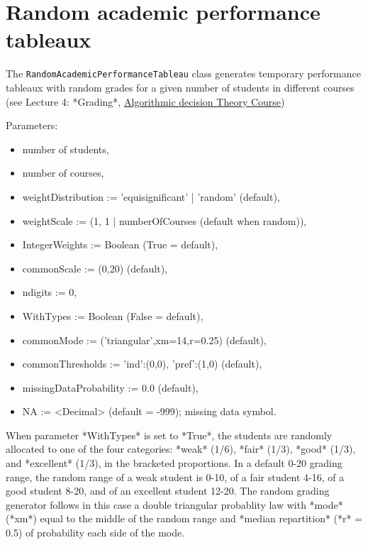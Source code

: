 \section{Random academic performance tableaux}
\label{sec:5.5}

The \texttt{RandomAcademicPerformanceTableau} class generates temporary performance tableaux with random grades for a given number of students in different courses (see Lecture 4: *Grading*, \href {http://hdl.handle.net/10993/37933}{Algorithmic decision Theory Course})
    
Parameters:
\begin{itemize}
\item number of students,
\item number of courses,
\item weightDistribution := 'equisignificant' | 'random' (default),
\item weightScale := (1, 1 | numberOfCourses (default when random)),
\item IntegerWeights := Boolean (True = default),
\item commonScale := (0,20) (default),
\item ndigits := 0,
\item WithTypes := Boolean (False = default),
\item commonMode := ('triangular',xm=14,r=0.25) (default),
\item commonThresholds := {'ind':(0,0), 'pref':(1,0)} (default),
\item missingDataProbability := 0.0 (default),
\item NA := <Decimal> (default = -999); missing data symbol. 
\end{itemize}      

When parameter *WithTypes* is set to *True*, the students are randomly allocated to one of the four categories: *weak* (1/6), *fair* (1/3), *good* (1/3), and *excellent* (1/3), in the bracketed proportions. In a default 0-20 grading range, the random range of a weak student is 0-10, of a fair student 4-16, of a good student 8-20, and of an excellent student 12-20. The random grading generator follows in this case a double triangular probablity law with *mode* (*xm*) equal to the middle of the random range and *median repartition* (*r* = 0.5) of probability each side of the mode.

